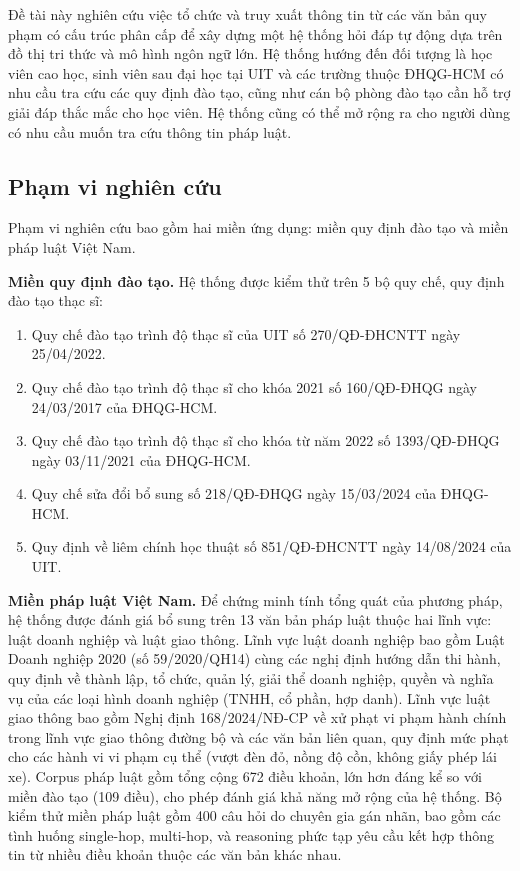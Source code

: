 Đề tài này nghiên cứu việc tổ chức và truy xuất thông tin từ các văn bản quy phạm có cấu trúc phân cấp để xây dựng một hệ thống hỏi đáp tự động dựa trên đồ thị tri thức và mô hình ngôn ngữ lớn. Hệ thống hướng đến đối tượng là học viên cao học, sinh viên sau đại học tại UIT và các trường thuộc ĐHQG-HCM có nhu cầu tra cứu các quy định đào tạo, cũng như cán bộ phòng đào tạo cần hỗ trợ giải đáp thắc mắc cho học viên. Hệ thống cũng có thể mở rộng ra cho người dùng có nhu cầu muốn tra cứu thông tin pháp luật.

\subsection{Phạm vi nghiên cứu}
\label{subsec:phamvi}

Phạm vi nghiên cứu bao gồm hai miền ứng dụng: miền quy định đào tạo và miền pháp luật Việt Nam.

\textbf{Miền quy định đào tạo.} Hệ thống được kiểm thử trên 5 bộ quy chế, quy định đào tạo thạc sĩ:
\begin{enumerate}
    \item Quy chế đào tạo trình độ thạc sĩ của UIT số 270/QĐ-ĐHCNTT ngày 25/04/2022.
    \item Quy chế đào tạo trình độ thạc sĩ cho khóa 2021 số 160/QĐ-ĐHQG ngày 24/03/2017 của ĐHQG-HCM.
    \item Quy chế đào tạo trình độ thạc sĩ cho khóa từ năm 2022 số 1393/QĐ-ĐHQG ngày 03/11/2021 của ĐHQG-HCM.
    \item Quy chế sửa đổi bổ sung số 218/QĐ-ĐHQG ngày 15/03/2024 của ĐHQG-HCM.
    \item Quy định về liêm chính học thuật số 851/QĐ-ĐHCNTT ngày 14/08/2024 của UIT.
\end{enumerate}

\textbf{Miền pháp luật Việt Nam.} Để chứng minh tính tổng quát của phương pháp, hệ thống được đánh giá bổ sung trên 13 văn bản pháp luật thuộc hai lĩnh vực: luật doanh nghiệp và luật giao thông. Lĩnh vực luật doanh nghiệp bao gồm Luật Doanh nghiệp 2020 (số 59/2020/QH14) cùng các nghị định hướng dẫn thi hành, quy định về thành lập, tổ chức, quản lý, giải thể doanh nghiệp, quyền và nghĩa vụ của các loại hình doanh nghiệp (TNHH, cổ phần, hợp danh). Lĩnh vực luật giao thông bao gồm Nghị định 168/2024/NĐ-CP về xử phạt vi phạm hành chính trong lĩnh vực giao thông đường bộ và các văn bản liên quan, quy định mức phạt cho các hành vi vi phạm cụ thể (vượt đèn đỏ, nồng độ cồn, không giấy phép lái xe). Corpus pháp luật gồm tổng cộng 672 điều khoản, lớn hơn đáng kể so với miền đào tạo (109 điều), cho phép đánh giá khả năng mở rộng của hệ thống. Bộ kiểm thử miền pháp luật gồm 400 câu hỏi do chuyên gia gán nhãn, bao gồm các tình huống single-hop, multi-hop, và reasoning phức tạp yêu cầu kết hợp thông tin từ nhiều điều khoản thuộc các văn bản khác nhau.

